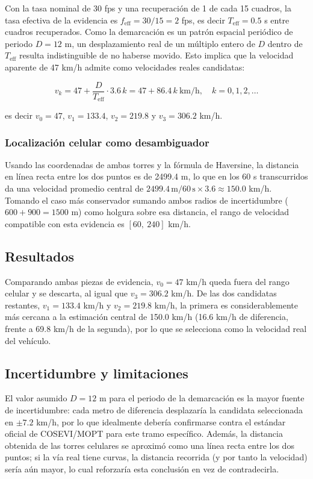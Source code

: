 \documentclass[conference]{IEEEtran}
\begin{document}
Con la tasa nominal de 30 fps y una recuperación de 1 de cada 15 cuadros, la tasa efectiva de la evidencia es $f_{\text{eff}}=30/15=2$ fps, es decir $T_{\text{eff}}=0.5$ s entre cuadros recuperados. 
Como la demarcación es un patrón espacial periódico de periodo $D=12$ m, un desplazamiento real de un múltiplo entero de $D$ dentro de $T_{\text{eff}}$ resulta indistinguible de no haberse movido. 
Esto implica que la velocidad aparente de 47 km/h admite como velocidades reales candidatas:

\begin{equation}
v_k = 47 + \frac{D}{T_{\text{eff}}}\cdot 3.6\,k = 47 + 86.4\,k \ \text{km/h}, \quad k=0,1,2,\dots
\label{eq:alias_velocidad}
\end{equation}

es decir $v_0=47$, $v_1=133.4$, $v_2=219.8$ y $v_3=306.2$ km/h.

\subsubsection{Localización celular como desambiguador}

Usando las coordenadas de ambas torres y la fórmula de Haversine, la distancia en línea recta entre los dos puntos es de 2499.4 m, lo que en los 60 s transcurridos da una velocidad promedio central de $2499.4\,\text{m}/60\,\text{s}\times3.6\approx150.0$ km/h. 
Tomando el caso más conservador sumando ambos radios de incertidumbre ($600+900=1500$ m) como holgura sobre esa distancia, el rango de velocidad compatible con esta evidencia es $[60,\ 240]$ km/h.

\subsection{Resultados}

Comparando ambas piezas de evidencia, $v_0=47$ km/h queda fuera del rango celular y se descarta, al igual que $v_3=306.2$ km/h. 
De las dos candidatas restantes, $v_1=133.4$ km/h y $v_2=219.8$ km/h, la primera es considerablemente más cercana a la estimación central de 150.0 km/h (16.6 km/h de diferencia, frente a 69.8 km/h de la segunda), por lo que se selecciona como la velocidad real del vehículo.

\subsection{Incertidumbre y limitaciones}

El valor asumido $D=12$ m para el periodo de la demarcación es la mayor fuente de incertidumbre: cada metro de diferencia desplazaría la candidata seleccionada en $\pm7.2$ km/h, por lo que idealmente debería confirmarse contra el estándar oficial de COSEVI/MOPT para este tramo específico. 
Además, la distancia obtenida de las torres celulares se aproximó como una línea recta entre los dos puntos; si la vía real tiene curvas, la distancia recorrida (y por tanto la velocidad) sería aún mayor, lo cual reforzaría esta conclusión en vez de contradecirla.
\end{document}
